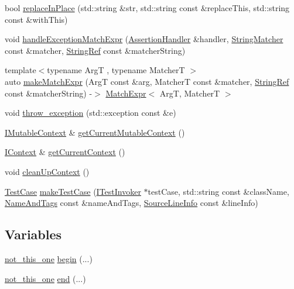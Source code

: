 \begin{DoxyCompactItemize}
\item 
bool \mbox{\hyperlink{namespace_catch_afe4e6770da547e43e9e4eeaa05f946ea}{replace\+In\+Place}} (std\+::string \&str, std\+::string const \&replace\+This, std\+::string const \&with\+This)
\item 
void \mbox{\hyperlink{namespace_catch_a3a96a82307107087642e22fc4be5844d}{handle\+Exception\+Match\+Expr}} (\mbox{\hyperlink{class_catch_1_1_assertion_handler}{Assertion\+Handler}} \&handler, \mbox{\hyperlink{namespace_catch_aba438977e831821a2eeca82b9b4f4af2}{String\+Matcher}} const \&matcher, \mbox{\hyperlink{class_catch_1_1_string_ref}{String\+Ref}} const \&matcher\+String)
\item 
{\footnotesize template$<$typename ArgT , typename MatcherT $>$ }\\auto \mbox{\hyperlink{namespace_catch_a23a9a9a6dfef7ecd5e0eaf553fc52de6}{make\+Match\+Expr}} (ArgT const \&arg, MatcherT const \&matcher, \mbox{\hyperlink{class_catch_1_1_string_ref}{String\+Ref}} const \&matcher\+String) -\/$>$ \mbox{\hyperlink{class_catch_1_1_match_expr}{Match\+Expr}}$<$ ArgT, MatcherT $>$
\item 
void \mbox{\hyperlink{namespace_catch_a3cbceeab9252d1b752f66a2826e92548}{throw\+\_\+exception}} (std\+::exception const \&e)
\item 
\mbox{\hyperlink{struct_catch_1_1_i_mutable_context}{I\+Mutable\+Context}} \& \mbox{\hyperlink{namespace_catch_af7bb0c32ab2453d2f53e92a96d15360e}{get\+Current\+Mutable\+Context}} ()
\item 
\mbox{\hyperlink{struct_catch_1_1_i_context}{I\+Context}} \& \mbox{\hyperlink{namespace_catch_ad517cca9b21deb79101e90e5508dd161}{get\+Current\+Context}} ()
\item 
void \mbox{\hyperlink{namespace_catch_ae50508f10ffc4ed873a31a4db4caea16}{clean\+Up\+Context}} ()
\item 
\mbox{\hyperlink{class_catch_1_1_test_case}{Test\+Case}} \mbox{\hyperlink{namespace_catch_a5e63df38d06a43d4cee17454e724b5c0}{make\+Test\+Case}} (\mbox{\hyperlink{struct_catch_1_1_i_test_invoker}{I\+Test\+Invoker}} $\ast$test\+Case, std\+::string const \&class\+Name, \mbox{\hyperlink{struct_catch_1_1_name_and_tags}{Name\+And\+Tags}} const \&name\+And\+Tags, \mbox{\hyperlink{struct_catch_1_1_source_line_info}{Source\+Line\+Info}} const \&line\+Info)
\end{DoxyCompactItemize}
\subsection*{Variables}
\begin{DoxyCompactItemize}
\item 
\mbox{\hyperlink{struct_catch_1_1not__this__one}{not\+\_\+this\+\_\+one}} \mbox{\hyperlink{namespace_catch_ac7ccff5c186bffa3b448b218ecf15956}{begin}} (...)
\item 
\mbox{\hyperlink{struct_catch_1_1not__this__one}{not\+\_\+this\+\_\+one}} \mbox{\hyperlink{namespace_catch_a71fef6a57614eb2d9751f8586ff6de6a}{end}} (...)
\end{DoxyCompactItemize}


